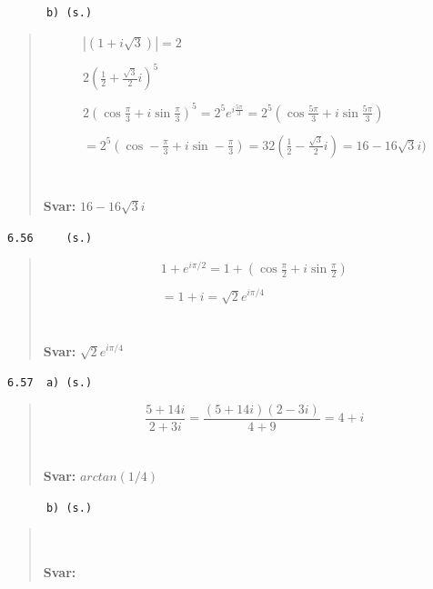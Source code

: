 \documentclass[a4paper]{article}
\newcommand{\tskcol}[1]{\textcolor{tskcol}{#1}}
\begin{document}
	\texttt{\tskcol{~~~~~~b) (s.)}}
	\begin{quotation}
		\noindent
		\begin{equation*}
			\begin{array}{l}
				|(1+i \sqrt{3})|=2\\\\
				2\left(\frac{1}{2}+\frac{\sqrt{3}}{2} i\right)^{5} \\\\
				2\left(\cos \frac{\pi}{3}+i \sin \frac{\pi}{3}\right)^{5}=2^{5} e^{i \frac{5\pi}{3}}

				=2^5\left(\cos \frac{5\pi}{3}+i \sin \frac{5 \pi}{3}\right) \\\\
				=2^{5}\left(\cos -\frac{\pi}{3}+i \sin -\frac{\pi}{3}\right)
				=32\left(\frac{1}{2}-\frac{\sqrt{3}}{2} i\right)=16-16\sqrt{3} i)
				\end{array}
				\end{equation*}
		\\ \\
		\textbf{Svar:} $16- 16\sqrt{3} i$
	\end{quotation}
	
	\texttt{\tskcol{6.56~~~~ (s.)}}
	\begin{quotation}
		\noindent
		\begin{equation}
			\begin{array}{l}
			1+e^{i \pi / 2}=1+\left(\cos \frac{\pi}{2}+i \sin \frac{\pi}{2}\right) \\\\
			=1+i=\sqrt{2} e^{i \pi / 4}
			\end{array}
			\end{equation}
		\\ \\
		\textbf{Svar:} $\sqrt{2} e^{i \pi / 4}$
	\end{quotation}
	
	\texttt{\tskcol{6.57~~a) (s.)}}
	\begin{quotation}
		\noindent
		\begin{equation}
			\frac{5+14 i}{2+3 i}=\frac{(5+14 i)(2-3 i)}{4+9}=4+i
			\end{equation}
		\\ \\
		\textbf{Svar:} $arctan(1/4)$
	\end{quotation}
	
	\texttt{\tskcol{~~~~~~b) (s.)}}
	\begin{quotation}
		\noindent
		\\ \\
		\textbf{Svar:}
	\end{quotation}
	
\end{document}
